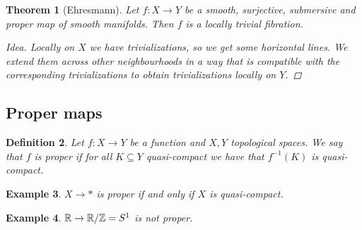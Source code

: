 \documentclass[A4paper, british]{amsart}
\theoremstyle{darkgreentheorem}
\newtheorem{thm}{Theorem}[section]
\theoremstyle{darkbluedefinition}
\newtheorem{defn}[thm]{Definition}
\theoremstyle{darkredexample}
\newtheorem{exa}[thm]{Example}
\theoremstyle{remark}
\newcommand{\1}{\mathbbm{1}}
\newcommand{\sub}{\subseteq}
\begin{document}
\begin{thm}[Ehresmann]
    Let $f\colon X\to Y$ be a smooth, surjective, submersive and proper map of smooth manifolds.
    Then $f$ is a locally trivial fibration.
    \begin{proof}[Idea]
	Locally on $X$ we have trivializations, so we get some horizontal lines.
	We extend them across other neighbourhoods in a way that is compatible with the corresponding trivializations to obtain trivializations locally on $Y$.
    \end{proof}
\end{thm}

\subsection{Proper maps}

\begin{defn}
    Let $f\colon X\to Y$ be a function and $X,Y$ topological spaces.
    We say that $f$ is \textit{proper} if for all $K\sub Y$ quasi-compact we have that $f^{-1}(K)$ is quasi-compact.
\end{defn}

\begin{exa}
    $X\to *$ is proper if and only if $X$ is quasi-compact.
\end{exa}

\begin{exa}
    $\mathbb{R}\to \mathbb{R}/\mathbb{Z}=S^{1}$ is not proper.
\end{exa}
\end{document}
